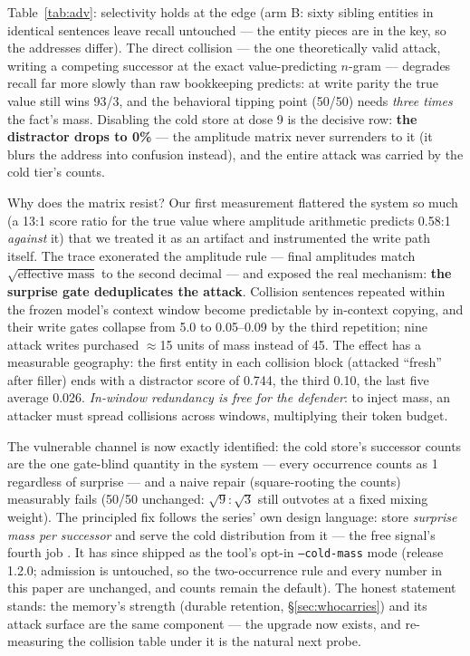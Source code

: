 \documentclass[11pt]{article}
\begin{document}
Table~\ref{tab:adv}: selectivity holds at the edge (arm B: sixty sibling entities in identical sentences leave recall untouched --- the entity pieces are in the key, so the addresses differ). The direct collision --- the one theoretically valid attack, writing a competing successor at the exact value-predicting $n$-gram --- degrades recall far more slowly than raw bookkeeping predicts: at write parity the true value still wins 93/3, and the behavioral tipping point (50/50) needs \emph{three times} the fact's mass. Disabling the cold store at dose 9 is the decisive row: \textbf{the distractor drops to 0\%} --- the amplitude matrix never surrenders to it (it blurs the address into confusion instead), and the entire attack was carried by the cold tier's counts.

Why does the matrix resist? Our first measurement flattered the system so much (a 13:1 score ratio for the true value where amplitude arithmetic predicts 0.58:1 \emph{against} it) that we treated it as an artifact and instrumented the write path itself. The trace exonerated the amplitude rule --- final amplitudes match $\sqrt{\text{effective mass}}$ to the second decimal --- and exposed the real mechanism: \textbf{the surprise gate deduplicates the attack}. Collision sentences repeated within the frozen model's context window become predictable by in-context copying, and their write gates collapse from 5.0 to 0.05--0.09 by the third repetition; nine attack writes purchased $\approx$15 units of mass instead of 45. The effect has a measurable geography: the first entity in each collision block (attacked ``fresh'' after filler) ends with a distractor score of 0.744, the third 0.10, the last five average 0.026. \emph{In-window redundancy is free for the defender}: to inject mass, an attacker must spread collisions across windows, multiplying their token budget.

The vulnerable channel is now exactly identified: the cold store's successor counts are the one gate-blind quantity in the system --- every occurrence counts as 1 regardless of surprise --- and a naive repair (square-rooting the counts) measurably fails (50/50 unchanged: $\sqrt{9}{:}\sqrt{3}$ still outvotes at a fixed mixing weight). The principled fix follows the series' own design language: store \emph{surprise mass per successor} and serve the cold distribution from it --- the free signal's fourth job \cite{hier}. It has since shipped as the tool's opt-in \texttt{--cold-mass} mode (release 1.2.0; admission is untouched, so the two-occurrence rule and every number in this paper are unchanged, and counts remain the default). The honest statement stands: the memory's strength (durable retention, \S\ref{sec:whocarries}) and its attack surface are the same component --- the upgrade now exists, and re-measuring the collision table under it is the natural next probe.
\end{document}
